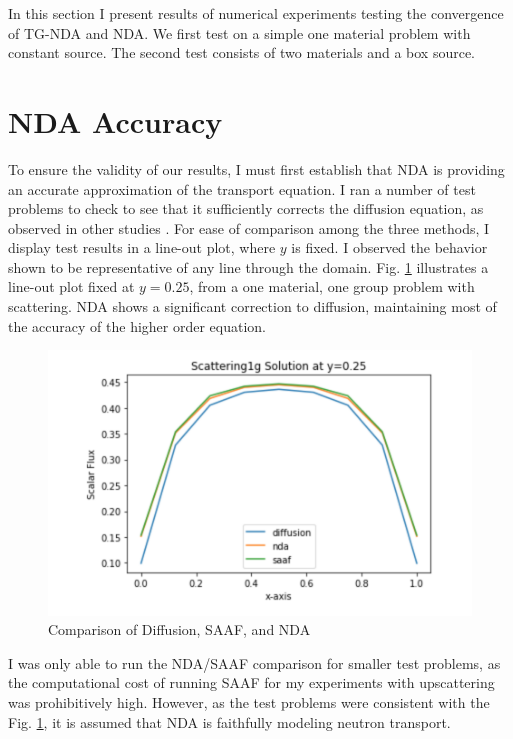 In this section I present results of numerical experiments testing the convergence of TG-NDA and NDA. We first test on a simple one material problem with constant source. The second test consists of two materials and a box source. 

\section{NDA Accuracy}

To ensure the validity of our results, I must first establish that NDA is providing an accurate approximation of the transport equation. I ran a number of test problems to check to see that it sufficiently corrects the diffusion equation, as observed in other studies \cite{morel-holo, Wang2013}. For ease of comparison among the three methods, I display test results in a line-out plot, where $y$ is fixed. I observed the behavior shown to be representative of any line through the domain. Fig. \ref{fig:comparison} illustrates a line-out plot fixed at $y=0.25$, from a one material, one group problem with scattering. NDA shows a significant correction to diffusion, maintaining most of the accuracy of the higher order equation. 
\begin{figure}[H]
    \centering
    \includegraphics[width=.75\textwidth]{fig/LineOut25.png}
    \caption{Comparison of Diffusion, SAAF, and NDA}
    \label{fig:comparison}
\end{figure}

I was only able to run the NDA/SAAF comparison for smaller test problems, as the computational cost of running SAAF for my experiments with upscattering was prohibitively high.  However, as the test problems were consistent with the Fig. \ref{fig:comparison}, it is assumed that NDA is faithfully modeling neutron transport. 

